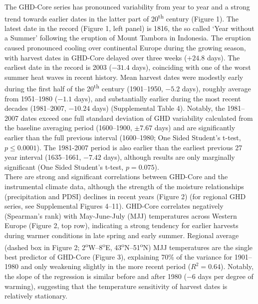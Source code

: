 \documentclass[final]{nature}
\begin{document}
\indent The GHD-Core series has pronounced variability from year to year and a strong trend towards earlier dates in the latter part of 20\textsuperscript{th} century (Figure 1). The latest date in the record (Figure 1, left panel) is 1816, the so called `Year without a Summer' following the eruption of Mount Tambora in Indonesia\cite{Oppenheimer2003}. The eruption caused pronounced cooling over continental Europe during the growing season, with harvest dates in GHD-Core delayed over three weeks ($+24.8$ days). The earliest date in the record is 2003 ($-31.4$ days), coinciding with one of the worst summer heat waves in recent history\cite{Rebetz2006}. Mean harvest dates were modestly early during the first half of the 20\textsuperscript{th} century (1901--1950, $-5.2$ days), roughly average from 1951--1980 ($-1.1$ days), and substantially earlier during the most recent decades (1981--2007, $-10.24$ days) (Supplemental Table 4). Notably, the 1981--2007 dates exceed one full standard deviation of GHD variability calculated from the baseline averaging period (1600--1900, $\pm7.67$ days) and are significantly earlier than the full previous interval (1600--1980; One Sided Student's t-test, $p\le0.0001$). The 1981-2007 period is also earlier than the earliest previous 27 year interval (1635--1661, $-7.42$ days), although results are only marginally significant (One Sided Student's t-test, $p=0.075$).\\
\indent There are strong and significant correlations between GHD-Core and the instrumental climate data, although the strength of the moisture relationships (precipitation and PDSI) declines in recent years (Figure 2) (for regional GHD series, see Supplemental Figures 4--11). GHD-Core correlates negatively (Spearman's rank) with May-June-July (MJJ) temperatures across Western Europe (Figure 2, top row), indicating a strong tendency for earlier harvests during warmer conditions in late spring and early summer. Regional average (dashed box in Figure 2; 2\textsuperscript{o}W--8\textsuperscript{o}E, 43\textsuperscript{o}N--51\textsuperscript{o}N) MJJ temperatures are the single best predictor of GHD-Core (Figure 3), explaining 70\% of the variance for 1901--1980 and only weakening slightly in the more recent period ($R^2=0.64$). Notably, the slope of the regression is similar before and after 1980 ($-6$ days per degree of warming), suggesting that the temperature sensitivity of harvest dates is relatively stationary.\\
\end{document}
